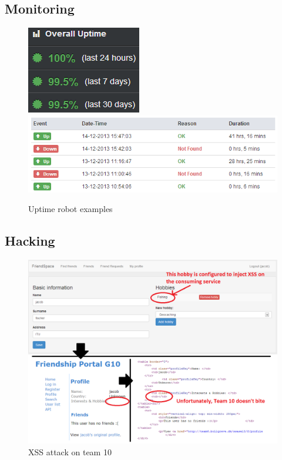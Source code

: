 \documentclass[a4paper]{article}
\begin{document}
\subsection{Monitoring}
\begin{figure}[h!]
\includegraphics[scale=0.4]{uptimerobot}
\includegraphics[scale=0.6]{uptimerobot2}
\label{fig:uptimerobot}
\caption{Uptime robot examples}
\end{figure}

\subsection{Hacking}
\begin{figure}[h!]
\centering
\includegraphics[scale=0.3]{Team10_XSS}
\caption{XSS attack on team 10}
\label{fig:xss_screencap}
\end{figure}


\end{document}
